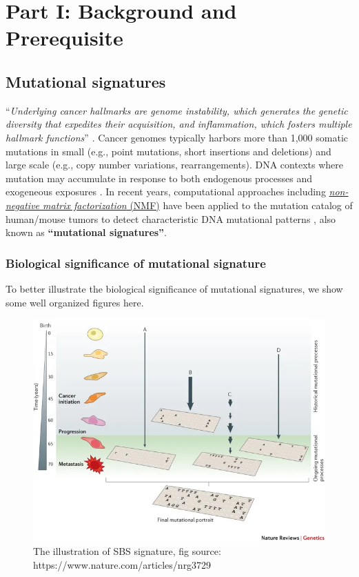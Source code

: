 \documentclass[
  12pt,
  a4paper,
  twoside]{book}
\begin{document}
\hypertarget{part-part-i-background-and-prerequisite}{%
\part*{Part I: Background and Prerequisite}\label{part-part-i-background-and-prerequisite}}

\hypertarget{mutsig-intro}{%
\chapter{Mutational signatures}\label{mutsig-intro}}

``\emph{Underlying cancer hallmarks are genome instability, which generates the genetic diversity that expedites their acquisition, and inflammation, which fosters multiple hallmark functions}'' \citep{hanahanHallmarksCancerNext2011}. Cancer genomes typically harbors more than 1,000 somatic mutations in small (e.g., point mutations, short insertions and deletions) and large scale (e.g., copy number variations, rearrangements). DNA contexts where mutation may accumulate in response to both endogenous processes and exogeneous exposures \citep{alexandrov2013signatures}. In recent years, computational approaches including \href{https://en.wikipedia.org/wiki/Non-negative_matrix_factorization}{\emph{non-negative matrix factorization} (NMF)} have been applied to the mutation catalog of human/mouse tumors to detect characteristic DNA mutational patterns \citep{alexandrov2013signatures, alexandrov2020repertoire, wang2021copy}, also known as \textbf{``mutational signatures''}.

\hypertarget{biological-significance-of-mutational-signature}{%
\section{Biological significance of mutational signature}\label{biological-significance-of-mutational-signature}}

To better illustrate the biological significance of mutational signatures, we show some
well organized figures here.

\begin{figure}
\includegraphics[width=0.8\linewidth]{fig/sbs_signature_overview_nat_review2} \caption{The illustration of SBS signature, fig source: https://www.nature.com/articles/nrg3729}\label{fig:unnamed-chunk-2}
\end{figure}
\end{document}
